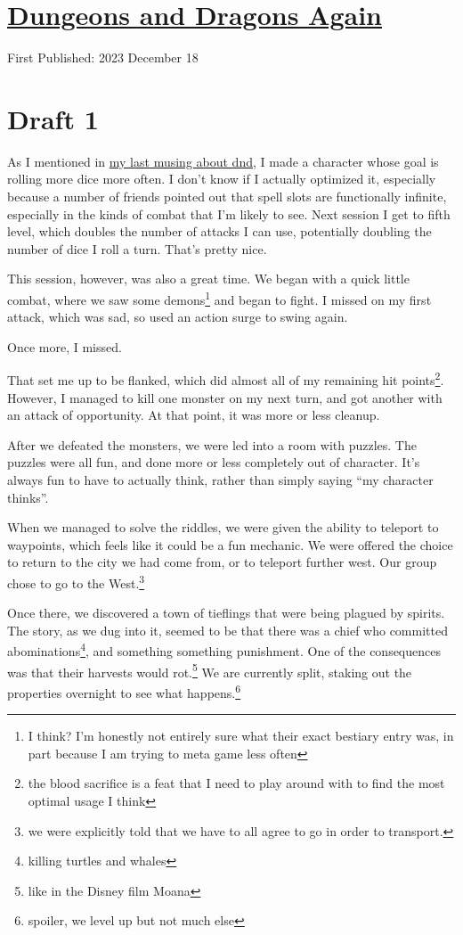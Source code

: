 \documentclass[12pt]{article}[titlepage]
\newcommand{\say}[1]{``#1''}
\renewcommand{\,}{\textsuperscript{,}}
\begin{document}
\doublespacing
\section{\href{dungeons-dragons-8.html}{Dungeons and Dragons Again}}
First Published: 2023 December 18

\section{Draft 1}
As I mentioned in \href{dungeons-dragons-7}{my last musing about dnd}, I made a character whose goal is rolling more dice more often.
I don't know if I actually optimized it, especially because a number of friends pointed out that spell slots are functionally infinite, especially in the kinds of combat that I'm likely to see.
Next session I get to fifth level, which doubles the number of attacks I can use, potentially doubling the number of dice I roll a turn.
That's pretty nice.

This session, however, was also a great time.
We began with a quick little combat, where we saw some demons\footnote{I think? I'm honestly not entirely sure what their exact bestiary entry was, in part because I am trying to meta game less often} and began to fight.
I missed on my first attack, which was sad, so used an action surge to swing again.

Once more, I missed.

That set me up to be flanked, which did almost all of my remaining hit points\footnote{the blood sacrifice is a feat that I need to play around with to find the most optimal usage I think}.
However, I managed to kill one monster on my next turn, and got another with an attack of opportunity.
At that point, it was more or less cleanup.

After we defeated the monsters, we were led into a room with puzzles.
The puzzles were all fun, and done more or less completely out of character.
It's always fun to have to actually think, rather than simply saying \say{my character thinks}.

When we managed to solve the riddles, we were given the ability to teleport to waypoints, which feels like it could be a fun mechanic.
We were offered the choice to return to the city we had come from, or to teleport further west.
Our group chose to go to the West.\footnote{we were explicitly told that we have to all agree to go in order to transport.}

Once there, we discovered a town of tieflings that were being plagued by spirits.
The story, as we dug into it, seemed to be that there was a chief who committed abominations\footnote{killing turtles and whales}, and something something punishment.
One of the consequences was that their harvests would rot.\footnote{like in the Disney film Moana}
We are currently split, staking out the properties overnight to see what happens.\footnote{spoiler, we level up but not much else}
\end{document}
